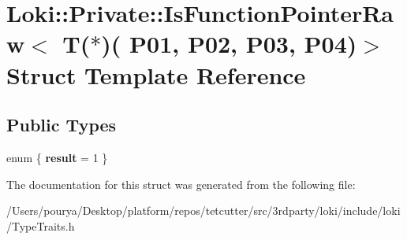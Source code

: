 \hypertarget{structLoki_1_1Private_1_1IsFunctionPointerRaw_3_01T_07_5_08_07_01_01_01_01_01_01_01_01_01_01_01_d5055af93ae7fdba157c48a6526c1f84}{}\section{Loki\+:\+:Private\+:\+:Is\+Function\+Pointer\+Raw$<$ T($\ast$)( P01, P02, P03, P04)$>$ Struct Template Reference}
\label{structLoki_1_1Private_1_1IsFunctionPointerRaw_3_01T_07_5_08_07_01_01_01_01_01_01_01_01_01_01_01_d5055af93ae7fdba157c48a6526c1f84}
\subsection*{Public Types}
\begin{DoxyCompactItemize}
\item 
\hypertarget{structLoki_1_1Private_1_1IsFunctionPointerRaw_3_01T_07_5_08_07_01_01_01_01_01_01_01_01_01_01_01_d5055af93ae7fdba157c48a6526c1f84_ae79a8450894b2529ae0d4744069774d1}{}enum \{ {\bfseries result} = 1
 \}\label{structLoki_1_1Private_1_1IsFunctionPointerRaw_3_01T_07_5_08_07_01_01_01_01_01_01_01_01_01_01_01_d5055af93ae7fdba157c48a6526c1f84_ae79a8450894b2529ae0d4744069774d1}

\end{DoxyCompactItemize}


The documentation for this struct was generated from the following file\+:\begin{DoxyCompactItemize}
\item 
/\+Users/pourya/\+Desktop/platform/repos/tetcutter/src/3rdparty/loki/include/loki/Type\+Traits.\+h\end{DoxyCompactItemize}
